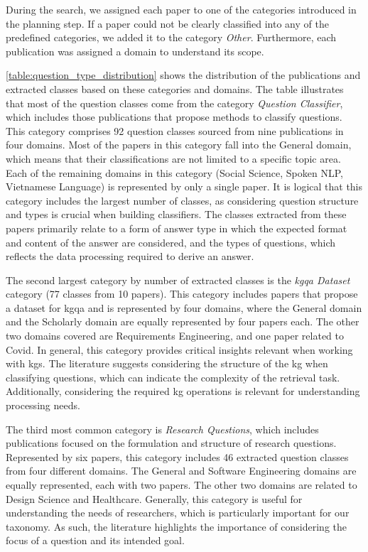 During the search, we assigned each paper to one of the categories introduced in the planning step. If a paper could not be clearly classified into any of the predefined categories, we added it to the category \emph{Other}. Furthermore, each publication was assigned a domain to understand its scope. 

\autoref{table:question_type_distribution} shows the distribution of the publications and extracted classes based on these categories and domains. The table illustrates that most of the question classes come from the category \emph{Question Classifier}, which includes those publications that propose methods to classify questions. This category comprises 92 question classes sourced from nine publications in four domains. Most of the papers in this category fall into the General domain, which means that their classifications are not limited to a specific topic area. Each of the remaining domains in this category (Social Science, Spoken NLP, Vietnamese Language) is represented by only a single paper. It is logical that this category includes the largest number of classes, as considering question structure and types is crucial when building classifiers. The classes extracted from these papers primarily relate to a form of answer type in which the expected format and content of the answer are considered, and the types of questions, which reflects the data processing required to derive an answer.

The second largest category by number of extracted classes is the \emph{\gls{kgqa} Dataset} category (77 classes from 10 papers). This category includes papers that propose a dataset for \gls{kgqa} and is represented by four domains, where the General domain and the Scholarly domain are equally represented by four papers each. The other two domains covered are Requirements Engineering, and one paper related to Covid. In general, this category provides critical insights relevant when working with \glspl{kg}. The literature suggests considering the structure of the \gls{kg} when classifying questions, which can indicate the complexity of the retrieval task. Additionally, considering the required \gls{kg} operations is relevant for understanding processing needs.

The third most common category is \emph{Research Questions}, which includes publications focused on the formulation and structure of research questions. Represented by six papers, this category includes 46 extracted question classes from four different domains. The General and Software Engineering domains are equally represented, each with two papers. The other two domains are related to Design Science and Healthcare. Generally, this category is useful for understanding the needs of researchers, which is particularly important for our taxonomy. As such, the literature highlights the importance of considering the focus of a question and its intended goal.

